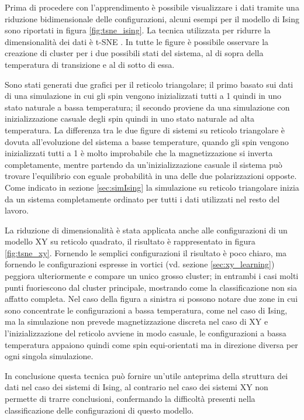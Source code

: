 \documentclass{article}
\begin{document}
Prima di procedere con l'apprendimento è possibile visualizzare i dati tramite una riduzione bidimensionale delle configurazioni, alcuni esempi per il modello di Ising sono riportati in figura \ref{fig:tsne_ising}.
La tecnica utilizzata per ridurre la dimensionalità dei dati è t-SNE \cite{tsne}.
In tutte le figure è possibile osservare la creazione di cluster per i due possibili stati del sistema, al di sopra della temperatura di transizione e al di sotto di essa.

Sono stati generati due grafici per il reticolo triangolare; il primo basato sui dati di una simulazione in cui gli spin vengono inizializzati tutti a 1 quindi in uno stato naturale a bassa temperatura; il secondo proviene da una simulazione con inizializzazione casuale degli spin quindi in uno stato naturale ad alta temperatura.
La differenza tra le due figure di sistemi su reticolo triangolare è dovuta all'evoluzione del sistema a basse temperature, quando gli spin vengono inizializzati tutti a 1 è molto improbabile che la magnetizzazione si inverta completamente, mentre partendo da un'inizializzazione casuale il sistema può trovare l'equilibrio con eguale probabilità in una delle due polarizzazioni opposte.
Come indicato in sezione \ref{sec:simIsing} la simulazione su reticolo triangolare inizia da un sistema completamente ordinato per tutti i dati utilizzati nel resto del lavoro.

La riduzione di dimensionalità è stata applicata anche alle configurazioni di un modello XY su reticolo quadrato, il risultato è rappresentato in figura \ref{fig:tsne_xy}.
Fornendo le semplici configurazioni il risultato è poco chiaro, ma fornendo le configurazioni espresse in vortici (vd. sezione \ref{sec:xy_learning}) peggiora ulteriormente e compare un unico grosso cluster; in entrambi i casi molti punti fuoriescono dal cluster principale, mostrando come la classificazione non sia affatto completa.
Nel caso della figura a sinistra si possono notare due zone in cui sono concentrate le configurazioni a bassa temperatura, come nel caso di Ising, ma la simulazione non prevede magnetizzazione discreta nel caso di XY e l'inizializzazione del reticolo avviene in modo casuale, le configurazioni a bassa temperatura appaiono quindi come spin equi-orientati ma in direzione diversa per ogni singola simulazione.

In conclusione questa tecnica può fornire un'utile anteprima della struttura dei dati nel caso dei sistemi di Ising, al contrario nel caso dei sistemi XY non permette di trarre conclusioni, confermando la difficoltà presenti nella classificazione delle configurazioni di questo modello.
\end{document}
